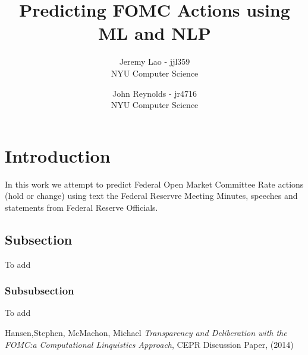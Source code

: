 \documentclass{article}
\title{Predicting FOMC Actions using ML and NLP}
\author{
        Jeremy Lao - jjl359 \\
        NYU Computer Science \\
            \and
        John Reynolds - jr4716 \\
        NYU Computer Science \\
}
\begin{document}
\maketitle


\section{Introduction}
In this work we attempt to predict Federal Open Market Committee Rate actions (hold or change) using
text the Federal Reservre Meeting Minutes, speeches and statements from Federal Reserve Officials.

\subsection{Subsection}\label{sec:nothing}

To add

\subsubsection{Subsubsection}\label{sec:nothing2}

To add

\begin{thebibliography}{99}

 Hansen,Stephen, McMachon, Michael  \emph{Transparency and Deliberation with the FOMC:a Computational Linquistics Approach}, CEPR Discussion Paper, (2014)

\end{thebibliography}
\end{document}
